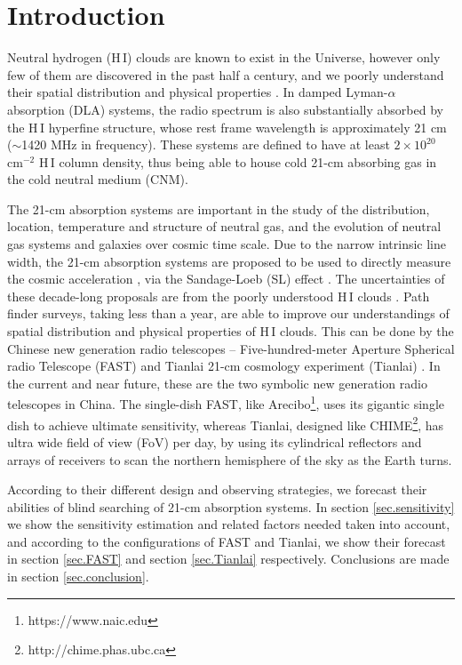 \documentclass[]{raa}
\newcommand{\HI}{{H{\small\,I}}}
\begin{document}
\section{Introduction}\label{sec.introduction}
Neutral hydrogen (\HI) clouds are known to exist in the Universe,
however only few of them are discovered in the past half a century,
and we poorly understand their spatial distribution and physical
properties \citep{2005ARA&A..43..861W}. 
In damped Lyman-$\alpha$ absorption (DLA)
systems, the radio spectrum is also substantially absorbed by the {\HI}
hyperfine structure, whose rest frame wavelength is approximately 21 cm
($\sim$1420 MHz in frequency). These systems are defined to have
at least $2\times 10^{20}$ cm$^{-2}$ {\HI} column density, thus being
able to house cold 21-cm absorbing gas in the cold neutral medium (CNM).

The 21-cm absorption systems are important in the study of the 
distribution, location, temperature and structure of neutral gas,
and the evolution of neutral gas systems and galaxies over
cosmic time scale.
Due to the narrow intrinsic line width, the 21-cm absorption systems
are proposed to be used to directly measure the cosmic acceleration
\citep{2012ApJ...761L..26D,2014PhRvL.113d1303Y}, via the 
Sandage-Loeb (SL) effect \citep{1962ApJ...136..319S,1998ApJ...499L.111L}.
The uncertainties of these decade-long proposals are from the poorly understood
{\HI} clouds \citep{2014PhRvL.113d1303Y}.
Path finder surveys, taking less than a year, are able
to improve our understandings of spatial distribution and physical
properties of {\HI} clouds.
This can be done by the Chinese new generation radio telescopes --
Five-hundred-meter Aperture Spherical radio Telescope (FAST)
\citep{2016RaSc...51.1060L} and Tianlai 21-cm cosmology experiment
(Tianlai) \citep{2012IJMPS..12..256C}. In the current and near future,
these are the two symbolic new generation radio telescopes in China.
The single-dish FAST, like Arecibo\footnote{https://www.naic.edu},
uses its gigantic single dish to achieve ultimate sensitivity, whereas
Tianlai, designed like CHIME\footnote{http://chime.phas.ubc.ca},
has ultra wide field of view (FoV) per day, by
using its cylindrical reflectors and arrays of receivers to
scan the northern hemisphere of the sky as the Earth turns.

According to their different design and observing strategies,
we forecast their abilities of blind searching of 21-cm absorption
systems. In section \ref{sec.sensitivity} we show the sensitivity
estimation and related factors needed taken into account,
and according to the configurations of FAST and Tianlai,
we show their forecast in section \ref{sec.FAST}
and section \ref{sec.Tianlai} respectively.
Conclusions are made in section \ref{sec.conclusion}.
\end{document}
